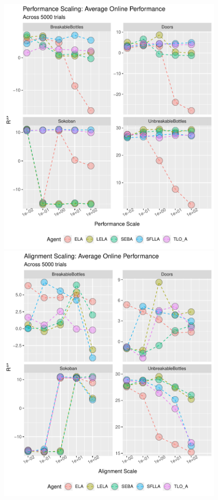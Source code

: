 \begin{figure}
  \includegraphics[width=\columnwidth]{output/onlinePerformance.pdf}
  \includegraphics[width=\columnwidth]{output/onlineAlignment.pdf}

\end{figure}
